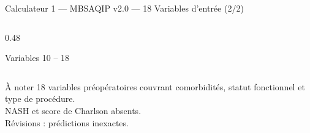 \documentclass[aspectratio=169]{beamer}
\begin{document}
\begin{frame}{Calculateur 1 --- MBSAQIP v2.0 --- 18 Variables d'entrée (2/2)}
\begin{columns}[T]
\begin{column}{0.48\textwidth}
\begin{block}{Variables 10 -- 18}
\begin{tabular}{cl}
          \bottomrule
        \end{tabular}
      \end{block}
      \vspace{0.4em}
      \begin{alertblock}{À noter}
        \footnotesize
        18 variables préopératoires couvrant comorbidités,
        statut fonctionnel et type de procédure.\\[4pt]
        \textcolor{rougealerte}{NASH et score de Charlson absents.}\\
        \textcolor{rougealerte}{Révisions : prédictions inexactes.}
      \end{alertblock}
    \end{column}
  \end{columns}
\end{frame}
\end{document}

